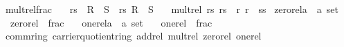 \documentclass[12pt]{scrartcl}
\begin{document}
\begin{isabelle}
\isanewline
\isanewline
{}\isamarkupfalse%
\ mult{\isacharunderscore}{\kern0pt}rel{\isacharunderscore}{\kern0pt}frac{\isacharcolon}{\kern0pt}\isanewline
\ \ \ {\isachardoublequoteopen}{\isacharparenleft}{\kern0pt}r{\isacharcomma}{\kern0pt}s{\isacharparenright}{\kern0pt}\ {\isasymin}\ R\ {\isasymtimes}\ S{\isachardoublequoteclose}\ \ {\isachardoublequoteopen}{\isacharparenleft}{\kern0pt}r{\isacharprime}{\kern0pt}{\isacharcomma}{\kern0pt}s{\isacharprime}{\kern0pt}{\isacharparenright}{\kern0pt}{\isasymin}\ R\ {\isasymtimes}\ S{\isachardoublequoteclose}\isanewline
\ \ \ {\isachardoublequoteopen}mult{\isacharunderscore}{\kern0pt}rel\ {\isacharparenleft}{\kern0pt}r{\isacharslash}{\kern0pt}s{\isacharparenright}{\kern0pt}\ {\isacharparenleft}{\kern0pt}r{\isacharprime}{\kern0pt}{\isacharslash}{\kern0pt}s{\isacharprime}{\kern0pt}{\isacharparenright}{\kern0pt}\ {\isacharequal}{\kern0pt}\ {\isacharparenleft}{\kern0pt}r{\isasymcdot}\ r{\isacharprime}{\kern0pt}{\isacharparenright}{\kern0pt}\ {\isacharslash}{\kern0pt}\ {\isacharparenleft}{\kern0pt}s{\isasymcdot}s{\isacharprime}{\kern0pt}{\isacharparenright}{\kern0pt}{\isachardoublequoteclose}
\isanewline
\isanewline
{}\isamarkupfalse%
\ zero{\isacharunderscore}{\kern0pt}rel{\isacharcolon}{\kern0pt}{\isacharcolon}{\kern0pt}{\isachardoublequoteopen}{\isacharparenleft}{\kern0pt}{\isacharprime}{\kern0pt}a\ {\isasymtimes}\ {\isacharprime}{\kern0pt}a{\isacharparenright}{\kern0pt}\ set{\isachardoublequoteclose}\ \isanewline
\ \ {\isachardoublequoteopen}zero{\isacharunderscore}{\kern0pt}rel\ {\isacharequal}{\kern0pt}\ frac\ {\isasymzero}\ {\isasymone}{\isachardoublequoteclose}\isanewline
\isanewline
{}\isamarkupfalse%
\ one{\isacharunderscore}{\kern0pt}rel{\isacharcolon}{\kern0pt}{\isacharcolon}{\kern0pt}{\isachardoublequoteopen}{\isacharparenleft}{\kern0pt}{\isacharprime}{\kern0pt}a\ {\isasymtimes}\ {\isacharprime}{\kern0pt}a{\isacharparenright}{\kern0pt}\ set{\isachardoublequoteclose}\ \isanewline
\ \ {\isachardoublequoteopen}one{\isacharunderscore}{\kern0pt}rel\ {\isacharequal}{\kern0pt}\ frac\ {\isasymone}\ {\isasymone}{\isachardoublequoteclose}\isanewline
\isanewline
{}\isamarkupfalse%
\ comm{\isacharunderscore}{\kern0pt}ring\ carrier{\isacharunderscore}{\kern0pt}quotient{\isacharunderscore}{\kern0pt}ring\ add{\isacharunderscore}{\kern0pt}rel\ mult{\isacharunderscore}{\kern0pt}rel\ zero{\isacharunderscore}{\kern0pt}rel\ one{\isacharunderscore}{\kern0pt}rel\isanewline
\isanewline
{}
\end{isabelle}
\end{document}
